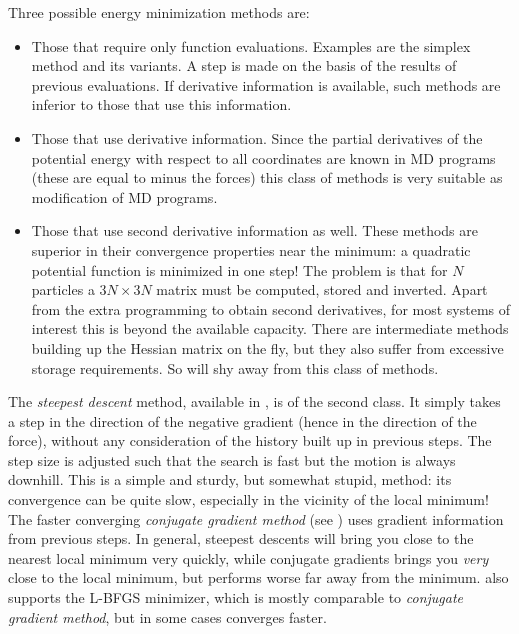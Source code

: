 Three possible energy minimization methods are:
\begin{itemize}
\item   Those that require only function evaluations. Examples are the 
        simplex method and its variants. A step is made on the basis of the 
        results of previous evaluations. If derivative information is 
        available, such methods are inferior to those that use 
        this information.
\item   Those that use derivative information. Since the partial 
        derivatives of the potential energy with respect to all 
        coordinates are known in MD programs (these are equal to minus 
        the forces) this class of methods is very suitable as modification 
        of MD programs.
\item   Those that use second derivative information as well. These methods 
        are superior in their convergence properties near the minimum: a 
        quadratic potential function is minimized in one step! The problem 
        is that for $N$ particles a $3N\times 3N$ matrix must be computed, 
        stored and inverted. Apart from the extra programming to obtain 
        second derivatives, for most systems of interest this is beyond the 
        available capacity. There are intermediate methods building up the 
        Hessian matrix on the fly, but they also suffer from excessive 
        storage requirements. So {\gromacs} will shy away from this class 
        of methods.
\end{itemize}


The {\em steepest descent} method, available in {\gromacs}, is of the
second class. It simply takes a step in the direction of the negative
gradient (hence in the direction of the force), without any
consideration of the history built up in previous steps. The step size
is adjusted such that the search is fast but the motion is always
downhill. This is a simple and sturdy, but somewhat stupid, method:
its convergence can be quite slow, especially in the vicinity of the
local minimum! The faster converging {\em conjugate gradient method}
(see {\eg} \cite{Zimmerman91}) uses gradient information from previous
steps. In general, steepest descents will bring you close to the
nearest local minimum very quickly, while conjugate gradients brings
you {\em very} close to the local minimum, but performs worse far away
from the minimum. {\gromacs} also supports the L-BFGS minimizer, which
is mostly comparable to {\em conjugate gradient method}, but in some 
cases converges faster.
